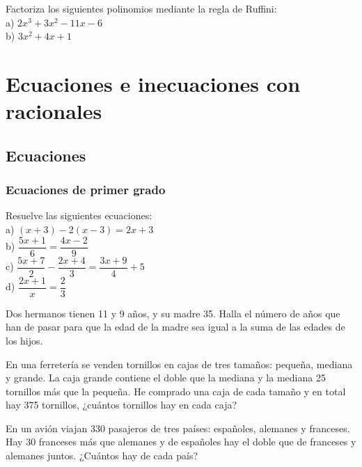 \begin{ejer}
Factoriza los siguientes polinomios mediante la regla de Ruffini:\\
a) $2x^3+3x^2-11x-6$ \\
b) $3x^2+4x+1$
\end{ejer}

\section{Ecuaciones e inecuaciones con racionales}

\subsection{Ecuaciones}

\subsubsection{Ecuaciones de primer grado}

\begin{ejer}
Resuelve las siguientes ecuaciones: \\
a) $(x+3)-2(x-3)=2x+3$ \\
b) $\dfrac{5x+1}{6}=\dfrac{4x-2}{9}$ \\
c) $\dfrac{5x+7}{2}-\dfrac{2x+4}{3} = \dfrac{3x+9}{4}+5$ \\
d) $\dfrac{2x+1}{x}=\dfrac{2}{3}$
\end{ejer}

\begin{ejer}
Dos hermanos tienen 11 y 9 años, y su madre 35. Halla el número de años que han de pasar para que la edad de la madre sea igual a la suma de las edades de los hijos.
\end{ejer}

\begin{ejer}
En una ferretería se venden tornillos en cajas de tres tamaños: pequeña, mediana y grande. La caja grande contiene el doble que la mediana y la mediana 25 tornillos más que la pequeña. He comprado una caja de cada tamaño y en total hay 375 tornillos, ¿cuántos tornillos hay en cada caja?
\end{ejer}

\begin{ejer}
En un avión viajan 330 pasajeros de tres países: españoles, alemanes y franceses. Hay 30 franceses más que alemanes y de españoles hay el doble que de franceses y alemanes juntos. ¿Cuántos hay de cada país?
\end{ejer}

